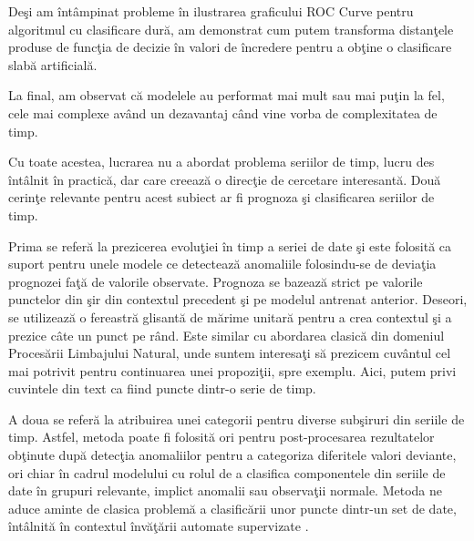 Deşi am întâmpinat probleme în ilustrarea graficului ROC Curve pentru algoritmul cu clasificare
dură, am demonstrat cum putem transforma distanţele produse de funcţia de decizie în valori 
de încredere pentru a obţine o clasificare slabă artificială.

La final, am observat că modelele au performat mai mult sau mai puţin la fel, cele mai complexe 
având un dezavantaj când vine vorba de complexitatea de timp.

Cu toate acestea, lucrarea nu a abordat problema seriilor de timp, lucru des întâlnit în practică,
dar care creează o direcţie de cercetare interesantă. Două cerinţe relevante pentru acest 
subiect ar fi prognoza şi clasificarea seriilor de timp. 

Prima se referă la prezicerea evoluţiei
în timp a seriei de date şi este folosită ca suport pentru unele modele ce detectează anomaliile
folosindu-se de deviaţia prognozei faţă de valorile observate. Prognoza se bazează strict pe 
valorile punctelor din şir din contextul precedent şi pe modelul antrenat anterior. Deseori,
se utilizează o fereastră glisantă de mărime unitară pentru a crea contextul şi a prezice 
câte un punct pe rând. Este similar cu abordarea clasică 
din domeniul Procesării Limbajului Natural, unde suntem interesaţi să prezicem cuvântul cel 
mai potrivit pentru continuarea unei propoziţii, spre exemplu. Aici, putem privi cuvintele
din text ca fiind puncte dintr-o serie de timp.

A doua se referă la atribuirea unei categorii pentru diverse subşiruri din seriile de timp.
Astfel, metoda poate fi folosită ori pentru post-procesarea rezultatelor obţinute după 
detecţia anomaliilor pentru a categoriza diferitele valori deviante, ori chiar în cadrul 
modelului cu rolul de a clasifica componentele din seriile de date în grupuri relevante,
implict anomalii sau observaţii normale. Metoda ne aduce aminte de clasica problemă
a clasificării unor puncte dintr-un set de date, întâlnită în contextul învăţării automate
supervizate \cite{time-series}.


